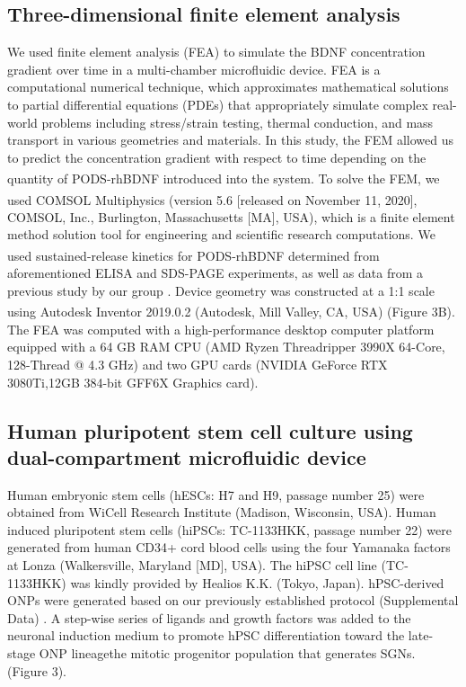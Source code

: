 \documentclass[review]{elsarticle}
\begin{document}
\subsection{Three-dimensional finite element analysis}
We used finite element analysis (FEA) to simulate the BDNF concentration gradient over time in a multi-chamber microfluidic device. FEA is a computational numerical technique, which approximates mathematical solutions to partial differential equations (PDEs) that appropriately simulate complex real-world problems including stress/strain testing, thermal conduction, and mass transport in various geometries and materials. In this study, the FEM allowed us to predict the concentration gradient with respect to time depending on the quantity of PODS\textsuperscript{\textregistered}-rhBDNF introduced into the system. To solve the FEM, we used COMSOL\textsuperscript{\textregistered} Multiphysics (version 5.6 [released on November 11, 2020], COMSOL, Inc., Burlington, Massachusetts [MA], USA), which is a finite element method solution tool for engineering and scientific research computations. We used sustained-release kinetics for PODS\textsuperscript{\textregistered}-rhBDNF determined from aforementioned ELISA and SDS-PAGE experiments, as well as data from a previous study by our group \cite{Chang2020}. Device geometry was constructed at a 1:1 scale using Autodesk\textsuperscript{\textregistered} Inventor 2019.0.2 (Autodesk, Mill Valley, CA, USA) (Figure 3B). The FEA was computed with a high-performance desktop computer platform equipped with a 64 GB RAM CPU (AMD Ryzen Threadripper 3990X 64-Core, 128-Thread @ 4.3 GHz) and two GPU cards (NVIDIA GeForce RTX 3080Ti,12GB 384-bit GFF6X Graphics card).


\subsection{Human pluripotent stem cell culture using dual-compartment microfluidic device}
Human embryonic stem cells (hESCs: H7 and H9, passage number 25) were obtained from WiCell Research Institute (Madison, Wisconsin, USA). Human induced pluripotent stem cells (hiPSCs:  TC-1133HKK, passage number 22) were generated from human CD34+ cord blood cells using the four Yamanaka factors at Lonza (Walkersville, Maryland [MD], USA). The hiPSC cell line (TC-1133HKK) was kindly provided by Healios K.K. (Tokyo, Japan). hPSC-derived ONPs were generated based on our previously established protocol (Supplemental Data) \cite{Heuer2021,Chang2020, Matsuoka2017g, Matsuoka2017}. A step-wise series of ligands and growth factors was added to the neuronal induction medium to promote hPSC differentiation toward the late-stage ONP lineage\textemdash the mitotic progenitor population that generates SGNs. (Figure 3).
\end{document}
